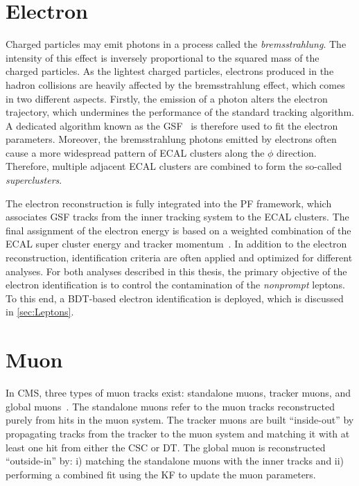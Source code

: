 \section{Electron}
\label{sec:Electron}

Charged particles may emit photons in a process called the \emph{bremsstrahlung}. The intensity of this effect is inversely proportional to the squared mass of the charged particles. As the lightest charged particles, electrons produced in the hadron collisions are heavily affected by the bremsstrahlung effect, which comes in two different aspects. Firstly, the emission of a photon alters the electron trajectory, which undermines the performance of the standard tracking algorithm. A dedicated algorithm known as the \ac{GSF}~\cite{Adam_2005} is therefore used to fit the electron parameters. Moreover, the bremsstrahlung photons emitted by electrons often cause a more widespread pattern of \ac{ECAL} clusters along the $\phi$ direction. Therefore, multiple adjacent \ac{ECAL} clusters are combined to form the so-called \emph{superclusters}.

The electron reconstruction is fully integrated into the \ac{PF} framework, which associates \ac{GSF} tracks from the inner tracking system to the \ac{ECAL} clusters. The final assignment of the electron energy is based on a weighted combination of the \ac{ECAL} super cluster energy and tracker momentum~\cite{Baffioni:2006cd}. In addition to the electron reconstruction, identification criteria are often applied and optimized for different analyses. For both analyses described in this thesis, the primary objective of the electron identification is to control the contamination of the \emph{nonprompt} leptons. To this end, a \ac{BDT}-based electron identification is deployed, which is discussed in \autoref{sec:Leptons}.

\section{Muon}
\label{sec:Muon}

In \ac{CMS}, three types of muon tracks exist: standalone muons, tracker muons, and global muons~\cite{CMS:2018rym}. The standalone muons refer to the muon tracks reconstructed purely from hits in the muon system. The tracker muons are built ``inside-out'' by propagating tracks from the tracker to the muon system and matching it with at least one hit from either the \ac{CSC} or \ac{DT}. The global muon is reconstructed ``outside-in'' by: i) matching the standalone muons with the inner tracks and ii) performing a combined fit using the \ac{KF} to update the muon parameters. 

